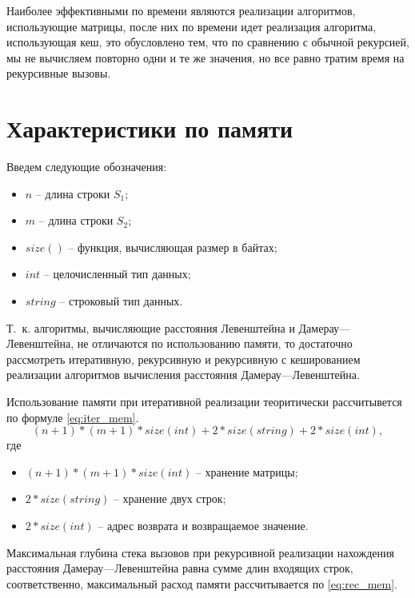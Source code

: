 \clearpage

Наиболее эффективными по времени являются реализации алгоритмов, использующие матрицы, после них по времени идет реализация алгоритма, использующая кеш, это обусловлено тем, что по сравнению с обычной рекурсией, мы не вычисляем повторно одни и те же значения, но все равно тратим время на рекурсивные вызовы. 

\section{Характеристики по памяти}

\label{memory}

Введем следующие обозначения:
\begin{itemize}
	\item $n$ -- длина строки $S_1$;
	\item $m$ -- длина строки $S_2$;
	\item $size()$ -- функция, вычисляющая размер в байтах;
	\item $int$ -- целочисленный тип данных;
	\item $string$ -- строковый тип данных.
\end{itemize}

Т.~к. алгоритмы, вычисляющие расстояния Левенштейна и Дамерау---Левенштейна, не отличаются по использованию памяти, то достаточно рассмотреть итеративную, рекурсивную и рекурсивную с кешированием реализации алгоритмов вычисления расстояния Дамерау---Левенштейна.


Использование памяти при итеративной реализации теоритически рассчитывется по формуле \eqref{eq:iter_mem}.
\begin{equation}
	\label{eq:iter_mem}
	(n + 1) * (m + 1) * size(int) + 2 * size(string) + 2 * size(int),
\end{equation}
где 
\begin{itemize}
	\item $ (n + 1) * (m + 1) * size(int) $ -- хранение матрицы;
	\item $ 2 * size(string) $ -- хранение двух строк;
	\item $ 2 * size(int) $ -- адрес возврата и возвращаемое значение.
\end{itemize}


Максимальная глубина стека вызовов при рекурсивной реализации
нахождения расстояния Дамерау---Левенштейна равна сумме длин входящих строк,
соответственно, максимальный расход памяти рассчитывается по \eqref{eq:rec_mem}.

